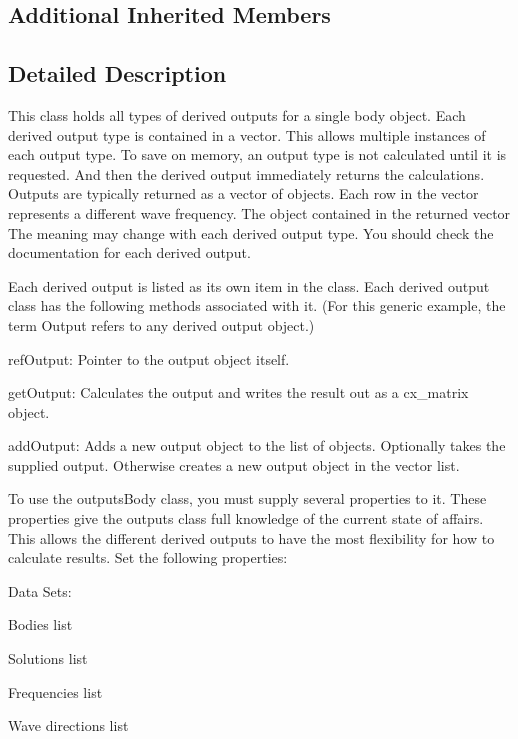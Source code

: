 \subsection*{Additional Inherited Members}


\subsection{Detailed Description}
This class holds all types of derived outputs for a single body object. Each derived output type is contained in a vector. This allows multiple instances of each output type. To save on memory, an output type is not calculated until it is requested. And then the derived output immediately returns the calculations. Outputs are typically returned as a vector of objects. Each row in the vector represents a different wave frequency. The object contained in the returned vector The meaning may change with each derived output type. You should check the documentation for each derived output.

Each derived output is listed as its own item in the class. Each derived output class has the following methods associated with it. (For this generic example, the term Output refers to any derived output object.)
\begin{DoxyEnumerate}
\item ref\-Output\-: Pointer to the output object itself.
\item get\-Output\-: Calculates the output and writes the result out as a cx\-\_\-matrix object.
\item add\-Output\-: Adds a new output object to the list of objects. Optionally takes the supplied output. Otherwise creates a new output object in the vector list.
\end{DoxyEnumerate}

To use the outputs\-Body class, you must supply several properties to it. These properties give the outputs class full knowledge of the current state of affairs. This allows the different derived outputs to have the most flexibility for how to calculate results. Set the following properties\-:

Data Sets\-:
\begin{DoxyEnumerate}
\item Bodies list
\item Solutions list
\item Frequencies list
\item Wave directions list
\end{DoxyEnumerate}

